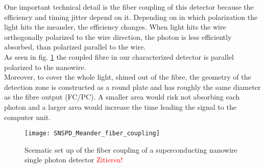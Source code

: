 One important technical detail is the fiber coupling of this detector because the efficiency
and timing jitter depend on it.
Depending on in which polarization the light hits the meander, the efficiency changes.
When light hits the wire orthogonally polarized to the wire direction, the photon is less efficiently absorbed, than
polarized parallel to the wire. \\ As seen in fig. \ref{fig:SNSPD_fiber_coupling} the coupled fibre in our characterized
detector is parallel polarized to the nanowire.\\
Moreover, to cover the whole light, shined out of the fibre, the geometry of the detection zone is constructed as a
round plate and has roughly the same diameter as the fibre output (FC/PC). A smaller area would risk not absorbing each
photon and a larger area would increase the time leading the signal to the computer unit.

\begin{figure}[hhh]
    \centering
    \texttt{[image: SNSPD\_Meander\_fiber\_coupling]}
    \caption{Scematic set up of the fiber coupling of a superconducting nanowire single photon detector \textcolor{red}{Zitieren!}}
    \label{fig:SNSPD_fiber_coupling}
\end{figure}



